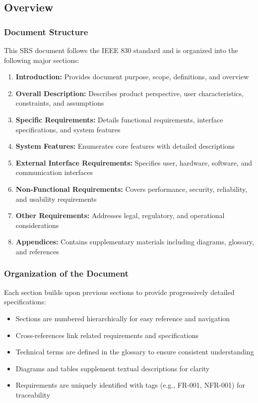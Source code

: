 \documentclass[12pt,a4paper]{article}
\begin{document}
\subsection{Overview}

\subsubsection{Document Structure}
This SRS document follows the IEEE 830 standard and is organized into the following major sections:

\begin{enumerate}
    \item \textbf{Introduction:} Provides document purpose, scope, definitions, and overview
    \item \textbf{Overall Description:} Describes product perspective, user characteristics, constraints, and assumptions
    \item \textbf{Specific Requirements:} Details functional requirements, interface specifications, and system features
    \item \textbf{System Features:} Enumerates core features with detailed descriptions
    \item \textbf{External Interface Requirements:} Specifies user, hardware, software, and communication interfaces
    \item \textbf{Non-Functional Requirements:} Covers performance, security, reliability, and usability requirements
    \item \textbf{Other Requirements:} Addresses legal, regulatory, and operational considerations
    \item \textbf{Appendices:} Contains supplementary materials including diagrams, glossary, and references
\end{enumerate}

\subsubsection{Organization of the Document}
Each section builds upon previous sections to provide progressively detailed specifications:
\begin{itemize}
    \item Sections are numbered hierarchically for easy reference and navigation
    \item Cross-references link related requirements and specifications
    \item Technical terms are defined in the glossary to ensure consistent understanding
    \item Diagrams and tables supplement textual descriptions for clarity
    \item Requirements are uniquely identified with tags (e.g., FR-001, NFR-001) for traceability
\end{itemize}
\end{document}
